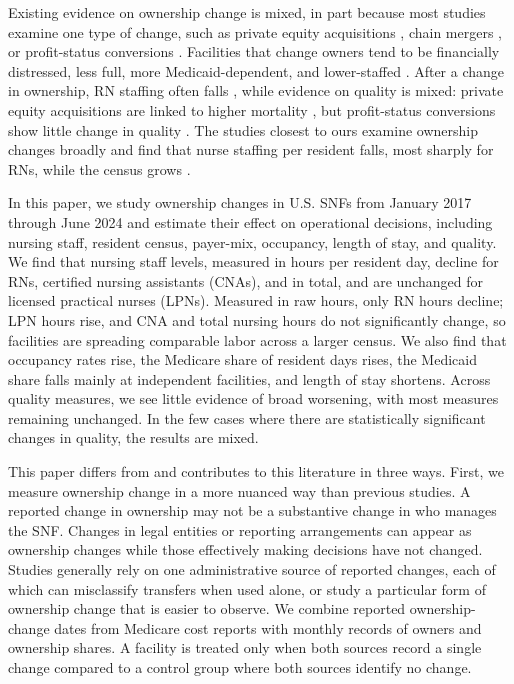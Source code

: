 \documentclass[12pt]{article}
\begin{document}
Existing evidence on ownership change is mixed, in part because most studies examine one type of change, such as private equity acquisitions \citep{GuptaEtAl2024, NBERw34306, huang_bowblis_2019}, chain mergers \citep{Hirth2019EffectsOfChains, Grabowski2016LowQualityNH}, or profit-status conversions \citep{grabowski_stevenson_2008, lu_lu_2022}. Facilities that change owners tend to be financially distressed, less full, more Medicaid-dependent, and lower-staffed \citep{bowblis_2011, lu_lu_2022, prusynski_humbert_mroz_2023}. After a change in ownership, RN staffing often falls \citep{lu_lu_2022, GuptaEtAl2024}, while evidence on quality is mixed: private equity acquisitions are linked to higher mortality \citep{GuptaEtAl2024}, but profit-status conversions show little change in quality \citep{grabowski_stevenson_2008}. The studies closest to ours examine ownership changes broadly and find that nurse staffing per resident falls, most sharply for RNs, while the census grows \citep{RyskinaEtAl2024, prusynski_et_al_2025}.

In this paper, we study ownership changes in U.S. SNFs from January 2017 through June 2024 and estimate their effect on operational decisions, including nursing staff, resident census, payer-mix, occupancy, length of stay, and quality. We find that nursing staff levels, measured in hours per resident day, decline for RNs, certified nursing assistants (CNAs), and in total, and are unchanged for licensed practical nurses (LPNs). Measured in raw hours, only RN hours decline; LPN hours rise, and CNA and total nursing hours do not significantly change, so facilities are spreading comparable labor across a larger census. We also find that occupancy rates rise, the Medicare share of resident days rises, the Medicaid share falls mainly at independent facilities, and length of stay shortens. Across quality measures, we see little evidence of broad worsening, with most measures remaining unchanged. In the few cases where there are statistically significant changes in quality, the results are mixed.

This paper differs from and contributes to this literature in three ways. First, we measure ownership change in a more nuanced way than previous studies. A reported change in ownership may not be a substantive change in who manages the SNF. Changes in legal entities or reporting arrangements can appear as ownership changes while those effectively making decisions have not changed. Studies generally rely on one administrative source of reported changes, each of which can misclassify transfers when used alone, or study a particular form of ownership change that is easier to observe. We combine reported ownership-change dates from Medicare cost reports with monthly records of owners and ownership shares. A facility is treated only when both sources record a single change compared to a control group where both sources identify no change.
\end{document}

